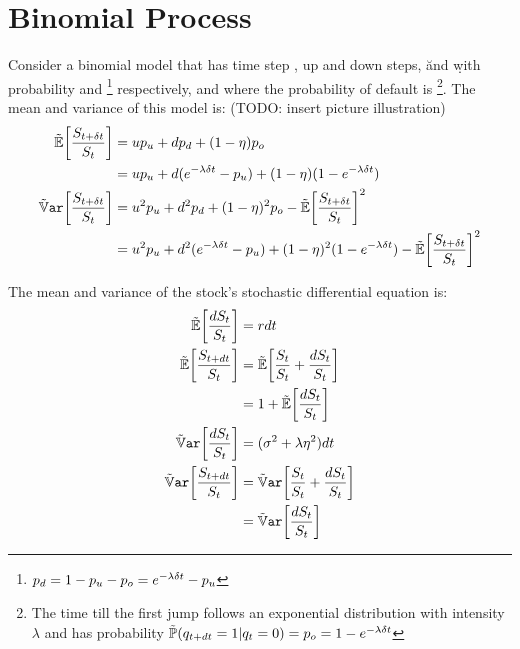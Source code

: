 \documentclass[a4paper,11pt,oneside]{report}
\theoremstyle{plain}
\theoremstyle{definition}
\begin{document}
\section{Binomial Process}
Consider a binomial model that has time step \Dt, up and down steps, \u and \d with probability \pu and \pd\footnote{$p_d = 1 - p_u - p_o = e^{-\lambda\delta t} - p_u$} respectively, and where the probability of default is \po\footnote{The time till the first jump follows an exponential distribution with intensity $\lambda$ and has probability $\Prob(q_{t + \dt} = 1 | q_t = 0) = \po = 1 - e^{-\lambda\Dt}$}.  The mean and variance of this model is: (TODO: insert picture illustration)
\begin{align}
 \E[\frac{\SDt}{\S}]   &= \u\pu + \d\pd + (1 - \eta)\po \n
                       &= \u\pu + \d(e^{-\lambda\Dt} - \pu) + (1 - \eta)(1 - e^{-\lambda\Dt}) \label{eq:BM_E} \\
 \Var[\frac{\SDt}{\S}] &= \u^2\pu + \d^2\pd + (1 - \eta)^2\po - \E[\frac{\SDt}{\S}]^2 \n
                       &= \u^2\pu + \d^2(e^{-\lambda\Dt} - \pu) + (1 - \eta)^2(1 - e^{-\lambda\Dt}) - \E[\frac{\SDt}{\S}]^2 \label{eq:BM_Var}
\end{align}

The mean and variance of the stock's stochastic differential equation is:
\begin{align}
 \E[\frac{\dS}{\S}]    &= r\dt \\
 \E[\frac{\Sdt}{\S}]   &= \E[\frac{\S}{\S} + \frac{\dS}{\S}] \n
                       &= 1 + \E[\frac{\dS}{\S}] \label{eq:SM_E} \\
 \Var[\frac{\dS}{\S}]  &= (\sigma^2 + \lambda\eta^2)\dt \\
 \Var[\frac{\Sdt}{\S}] &= \Var[\frac{\S}{\S} + \frac{\dS}{\S}] \n
                       &= \Var[\frac{\dS}{\S}] \label{eq:SM_Var}
\end{align}


\end{document}
